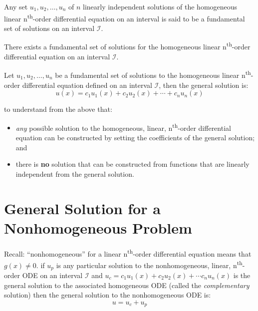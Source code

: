 \begin{definition}
Any set $u_1,u_2,\dots,u_n$ of $n$ linearly independent solutions of the homogeneous linear n\textsuperscript{th}-order differential equation on an interval is said to be a fundamental set of solutions on an interval $\mathcal{I}$.  
\end{definition}
\begin{theorem}
There exists a fundamental set of solutions for the homogeneous linear n\textsuperscript{th}-order differential equation on an interval $\mathcal{I}$.
\end{theorem}

\begin{definition}
Let $u_1,u_2,\dots,u_n$ be a fundamental set of solutions to the homogeneous linear n\textsuperscript{th}-order differential equation defined on an interval $\mathcal{I}$, then the general solution is:
$$u(x) = c_1u_1(x)+c_2u_2(x)+\cdots+c_nu_n(x)$$
\end{definition}

 to understand from the above that:
\begin{itemize}
\item \emph{any} possible solution to the homogeneous, linear, n\textsuperscript{th}-order differential equation can be constructed by setting the coefficients of the general solution; and
\item there is \textbf{no} solution that can be constructed from functions that are linearly independent from the general solution.
\end{itemize}

\section{General Solution for a Nonhomogeneous Problem}
Recall: ``nonhomogeneous'' for a linear n\textsuperscript{th}-order differential equation means that $g(x)\ne 0$.  if $u_p$ is any particular solution to the nonhomogeneous, linear, n\textsuperscript{th}-order ODE on an interval $\mathcal{I}$ and $u_c = c_1u_1(x) + c_2u_2(x)+\cdots c_nu_n(x)$ is the general solution to the associated homogeneous ODE (called the \emph{complementary} solution) then the general solution to the nonhomogeneous ODE is:
\begin{equation*}
u = u_c + u_p
\end{equation*}

